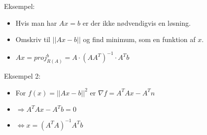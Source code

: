 \documentclass[danish, 10pt]{Memoir}
\begin{document}
Eksempel:
\begin{itemize}
	\item Hvis man har $Ax=b$ er der ikke nødvendigvis en løsning.
	\item Omskriv til $||Ax-b||$ og find minimum, som en funktion af $x$.
	\item $Ax = proj_{R(A)}^b = A \cdot	(AA^T)^{-1} \cdot A^T b$
\end{itemize}

Eksempel 2:
\begin{itemize}
	\item For $f(x) = ||Ax-b||^2$ er $\nabla f = A^TAx - A^Tn $
	\item[] $\Rightarrow A^TAx-A^Tb = 0$
	\item[] $\Leftrightarrow x = (A^TA)^{-1}A^T b$
\end{itemize}
\end{document}
